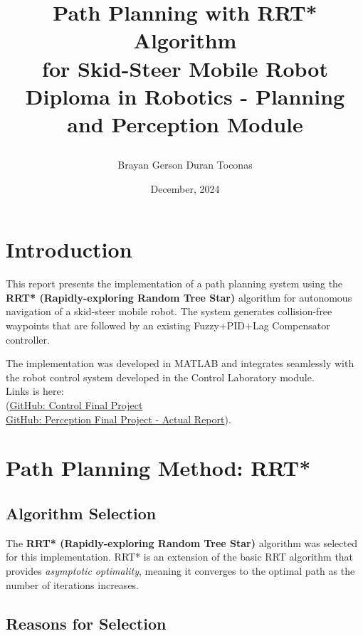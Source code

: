 \documentclass[12pt,a4paper]{scrartcl}
\title{
    \vspace*{-2.25cm}  %
    \begin{center}
        \textbf{Path Planning with RRT* Algorithm \\ for Skid-Steer Mobile Robot} \\
        \vspace{0.3cm}
        {\large Diploma in Robotics - Planning and Perception Module}
    \end{center}
}
\author{Brayan Gerson Duran Toconas}
\date{December, 2024}
\begin{document}
	
	
	\maketitle
	\tableofcontents
	\newpage
	
	\section{Introduction}
	
	\justify
	This report presents the implementation of a path planning system using the \textbf{RRT* (Rapidly-exploring Random Tree Star)} algorithm for autonomous navigation of a skid-steer mobile robot. The system generates collision-free waypoints that are followed by an existing Fuzzy+PID+Lag Compensator controller.
	
	The implementation was developed in MATLAB and integrates seamlessly with the robot control system developed in the Control Laboratory module. \\Links is here: \\(\href{https://github.com/97hackbrian/RoboticsLab_DRM/tree/main/Control_lab/final_work}{GitHub: Control Final Project} \\ \href{https://github.com/97hackbrian/RoboticsLab_DRM/tree/main/Perception_and_planning_lab/final_work}{GitHub: Perception Final Project - Actual Report}).
	
	\section{Path Planning Method: RRT*}
	
	\subsection{Algorithm Selection}
	
	The \textbf{RRT* (Rapidly-exploring Random Tree Star)} algorithm was selected for this implementation. RRT* is an extension of the basic RRT algorithm that provides \textit{asymptotic optimality}, meaning it converges to the optimal path as the number of iterations increases.
	
	\subsection{Reasons for Selection}
	
\end{document}
